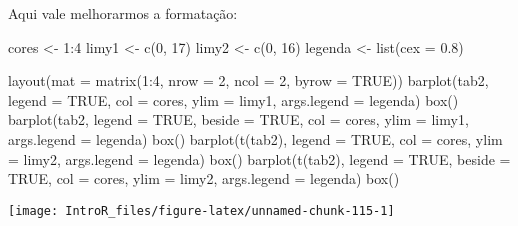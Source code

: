 \documentclass[
]{book}
\newenvironment{Shaded}{\begin{snugshade}}{\end{snugshade}}
\newcommand{\AttributeTok}[1]{\textcolor[rgb]{0.77,0.63,0.00}{#1}}
\newcommand{\ConstantTok}[1]{\textcolor[rgb]{0.00,0.00,0.00}{#1}}
\newcommand{\DecValTok}[1]{\textcolor[rgb]{0.00,0.00,0.81}{#1}}
\newcommand{\FloatTok}[1]{\textcolor[rgb]{0.00,0.00,0.81}{#1}}
\newcommand{\FunctionTok}[1]{\textcolor[rgb]{0.00,0.00,0.00}{#1}}
\newcommand{\NormalTok}[1]{#1}
\newcommand{\OtherTok}[1]{\textcolor[rgb]{0.56,0.35,0.01}{#1}}
\newcommand{\SpecialCharTok}[1]{\textcolor[rgb]{0.00,0.00,0.00}{#1}}
\begin{document}
Aqui vale melhorarmos a formatação:

\begin{Shaded}
\begin{Highlighting}[]
\NormalTok{cores }\OtherTok{\textless{}{-}} \DecValTok{1}\SpecialCharTok{:}\DecValTok{4}
\NormalTok{limy1 }\OtherTok{\textless{}{-}} \FunctionTok{c}\NormalTok{(}\DecValTok{0}\NormalTok{, }\DecValTok{17}\NormalTok{)}
\NormalTok{limy2 }\OtherTok{\textless{}{-}} \FunctionTok{c}\NormalTok{(}\DecValTok{0}\NormalTok{, }\DecValTok{16}\NormalTok{)}
\NormalTok{legenda }\OtherTok{\textless{}{-}} \FunctionTok{list}\NormalTok{(}\AttributeTok{cex =} \FloatTok{0.8}\NormalTok{)}

\FunctionTok{layout}\NormalTok{(}\AttributeTok{mat =} \FunctionTok{matrix}\NormalTok{(}\DecValTok{1}\SpecialCharTok{:}\DecValTok{4}\NormalTok{, }\AttributeTok{nrow =} \DecValTok{2}\NormalTok{, }\AttributeTok{ncol =} \DecValTok{2}\NormalTok{, }\AttributeTok{byrow =} \ConstantTok{TRUE}\NormalTok{))}
\FunctionTok{barplot}\NormalTok{(tab2, }\AttributeTok{legend =} \ConstantTok{TRUE}\NormalTok{, }\AttributeTok{col =}\NormalTok{ cores, }\AttributeTok{ylim =}\NormalTok{ limy1, }
        \AttributeTok{args.legend =}\NormalTok{ legenda)}
\FunctionTok{box}\NormalTok{()}
\FunctionTok{barplot}\NormalTok{(tab2, }\AttributeTok{legend =} \ConstantTok{TRUE}\NormalTok{, }\AttributeTok{beside =} \ConstantTok{TRUE}\NormalTok{, }\AttributeTok{col =}\NormalTok{ cores, }
        \AttributeTok{ylim =}\NormalTok{ limy1, }\AttributeTok{args.legend =}\NormalTok{ legenda)}
\FunctionTok{box}\NormalTok{()}
\FunctionTok{barplot}\NormalTok{(}\FunctionTok{t}\NormalTok{(tab2), }\AttributeTok{legend =} \ConstantTok{TRUE}\NormalTok{, }\AttributeTok{col =}\NormalTok{ cores, }\AttributeTok{ylim =}\NormalTok{ limy2, }
        \AttributeTok{args.legend =}\NormalTok{ legenda)}
\FunctionTok{box}\NormalTok{()}
\FunctionTok{barplot}\NormalTok{(}\FunctionTok{t}\NormalTok{(tab2), }\AttributeTok{legend =} \ConstantTok{TRUE}\NormalTok{, }\AttributeTok{beside =} \ConstantTok{TRUE}\NormalTok{, }\AttributeTok{col =}\NormalTok{ cores, }
        \AttributeTok{ylim =}\NormalTok{ limy2, }\AttributeTok{args.legend =}\NormalTok{ legenda)}
\FunctionTok{box}\NormalTok{()}
\end{Highlighting}
\end{Shaded}

\begin{center}\texttt{[image: IntroR\_files/figure-latex/unnamed-chunk-115-1]} \end{center}
\end{document}
